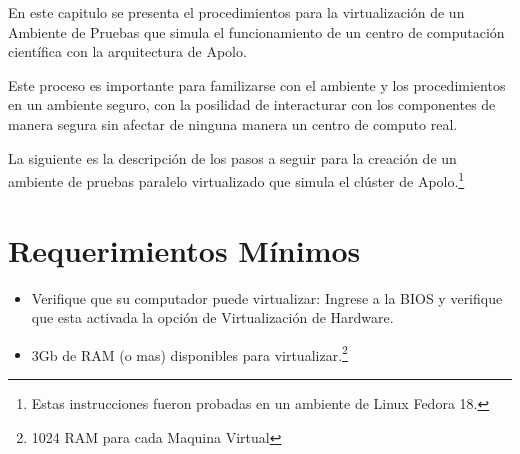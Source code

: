 En este capitulo se presenta el procedimientos para la virtualización de un Ambiente de Pruebas que simula el funcionamiento de un centro de computación científica con la arquitectura de Apolo. 

Este proceso es importante para familizarse con el ambiente y los procedimientos en un ambiente seguro, con la posilidad de interacturar con los componentes de manera segura sin afectar de ninguna manera un centro de computo real. 

La siguiente es la descripción de los pasos a seguir para la creación de un ambiente de pruebas paralelo virtualizado que simula el clúster de Apolo.\footnote{Estas instrucciones fueron probadas en un ambiente de Linux Fedora 18.}

\section{Requerimientos Mínimos}

\begin{itemize}
	\item Verifique que su computador puede virtualizar: Ingrese a la BIOS y verifique que esta activada la opción de Virtualización de Hardware. 

	\item 3Gb de RAM (o mas)  disponibles para virtualizar.\footnote{1024 RAM para cada Maquina Virtual}
\end{itemize}

